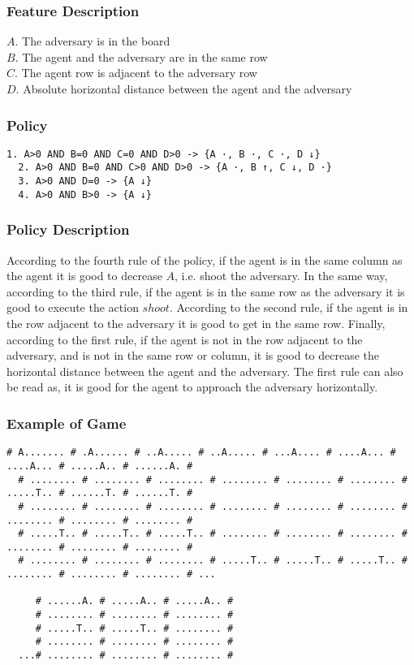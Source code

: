 \documentclass[a4paper]{article}
\begin{document}
\subsubsection{Feature Description}
$A$. The adversary is in the board\\
$B$. The agent and the adversary are in the same row\\
$C$. The agent row is adjacent to the adversary row\\
$D$. Absolute horizontal distance between the agent and the adversary

\subsubsection{Policy}
\begin{Verbatim}[fontsize=\footnotesize]
  1. A>0 AND B=0 AND C=0 AND D>0 -> {A ·, B ·, C ·, D ↓}
  2. A>0 AND B=0 AND C>0 AND D>0 -> {A ·, B ↑, C ↓, D ·}
  3. A>0 AND D=0 -> {A ↓}
  4. A>0 AND B>0 -> {A ↓}
\end{Verbatim}

\subsubsection{Policy Description}
According to the fourth rule of the policy, if the agent is in the same column as the agent it is good to decrease $A$, i.e. shoot the adversary. In the same way, according to the third rule, if the agent is in the same row as the adversary it is good to execute the action $shoot$. According to the second rule, if the agent is in the row adjacent to the adversary it is good to get in the same row. Finally, according to the first rule, if the agent is not in the row adjacent to the adversary, and is not in the same row or column, it is good to decrease the horizontal distance between the agent and the adversary. The first rule can also be read as, it is good for the agent to approach the adversary horizontally.

\subsubsection{Example of Game}
\begin{Verbatim}[fontsize=\footnotesize]
  # A....... # .A...... # ..A..... # ..A..... # ...A.... # ....A... # ....A... # .....A.. # ......A. #
  # ........ # ........ # ........ # ........ # ........ # ........ # .....T.. # ......T. # ......T. #
  # ........ # ........ # ........ # ........ # ........ # ........ # ........ # ........ # ........ #
  # .....T.. # .....T.. # .....T.. # ........ # ........ # ........ # ........ # ........ # ........ #
  # ........ # ........ # ........ # .....T.. # .....T.. # .....T.. # ........ # ........ # ........ # ...

     # ......A. # .....A.. # .....A.. #
     # ........ # ........ # ........ #
     # .....T.. # .....T.. # ........ #
     # ........ # ........ # ........ #
  ...# ........ # ........ # ........ #

\end{Verbatim}
\end{document}
